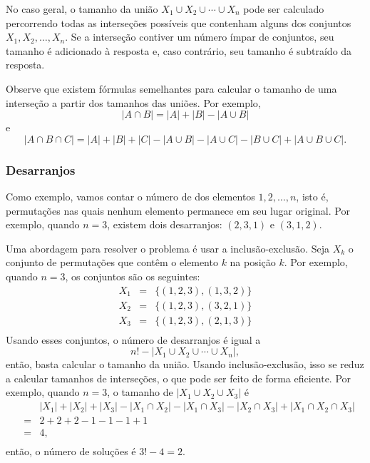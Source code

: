 No caso geral, o tamanho da
união $X_1 \cup X_2 \cup \cdots \cup X_n$
pode ser calculado percorrendo todas as
interseções possíveis que contenham alguns dos conjuntos $X_1,X_2,\ldots,X_n$.
Se a interseção contiver um número ímpar de conjuntos,
seu tamanho é adicionado à resposta
e, caso contrário, seu tamanho é subtraído da resposta.

Observe que existem fórmulas semelhantes
para calcular
o tamanho de uma interseção a partir dos tamanhos das
uniões. Por exemplo,
\[ |A \cap B| = |A| + |B| - |A \cup B|\]
e
\[ |A \cap B \cap C| = |A| + |B| + |C| - |A \cup B|  - |A \cup C|  - |B \cup C| + |A \cup B \cup C| .\]

\subsubsection{Desarranjos}


Como exemplo, vamos contar o número de 
dos elementos ${1,2,\ldots,n}$, isto é, permutações
nas quais nenhum elemento permanece em seu lugar original.
Por exemplo, quando $n=3$, existem
dois desarranjos: $(2,3,1)$ e $(3,1,2)$.

Uma abordagem para resolver o problema é usar
a inclusão-exclusão.
Seja $X_k$ o conjunto de permutações
que contêm o elemento $k$ na posição $k$.
Por exemplo, quando $n=3$, os conjuntos são os seguintes:
\[
\begin{array}{lcl}
X_1 & = & \{(1,2,3),(1,3,2)\} \\
X_2 & = & \{(1,2,3),(3,2,1)\} \\
X_3 & = & \{(1,2,3),(2,1,3)\} \\
\end{array}
\]
Usando esses conjuntos, o número de desarranjos é igual a
\[ n! - |X_1 \cup X_2 \cup \cdots \cup X_n|, \]
então, basta calcular o tamanho da união.
Usando inclusão-exclusão, isso se reduz a
calcular tamanhos de interseções, o que pode ser
feito de forma eficiente.
Por exemplo, quando $n=3$, o tamanho de
$|X_1 \cup X_2 \cup X_3|$ é
\[
\begin{array}{lcl}
 & & |X_1| + |X_2| + |X_3| - |X_1 \cap X_2|  - |X_1 \cap X_3|  - |X_2 \cap X_3| + |X_1 \cap X_2 \cap X_3| \\
 & = & 2+2+2-1-1-1+1 \\
 & = & 4, \\
\end{array}
\]
então, o número de soluções é $3!-4=2$.

